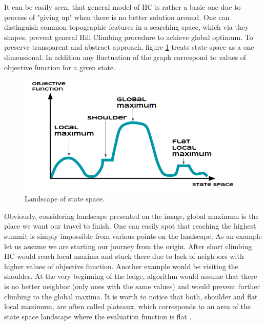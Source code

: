 \documentclass{mini}
\begin{document}
It can be easily seen, that general model of HC is rather a basic one due to process of "giving up" when there is no better solution around. One can distinguish common topographic features in a searching space, which via they shapes, prevent general Hill Climbing procedure to achieve global optimum. To preserve transparent and abstract approach, figure \ref{fig:state_space} treats state space as a one dimensional. In addition any fluctuation of the graph correspond to values of objective function for a given state. 

\begin{figure}
  \begin{flushleft}
     \includegraphics[width=1\textwidth]{./images/hp_landscape.png} 
  \end{flushleft}
  \label{fig:state_space}
  \caption{Landscape of state space.}
\end{figure}

Obviously, considering landscape presented on the image, global maximum is the place we want our travel to finish. One can easily spot that reaching the highest summit is simply impossible from various points on the landscape. As an example let us assume we are starting our journey from the origin. After short climbing HC would reach local maxima and stuck there due to lack of neighbors with higher values of objective function. Another example would be visiting the shoulder. At the very beginning of the ledge, algorithm would assume that there is no better neighbor (only ones with the same values) and would prevent further climbing to the global maxima. It is worth to notice that both, shoulder and flat local maximum, are often called plateaux, which corresponds to an area of the state space landscape where the evaluation function is flat \cite{hc_3}.
\end{document}
